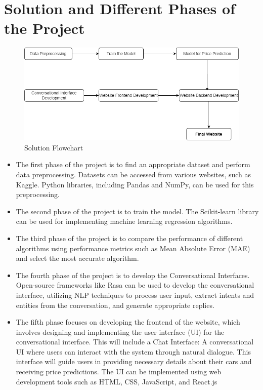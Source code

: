 \documentclass[a4paper,12pt]{article}
\begin{document}
\newpage
\section*{Solution and Different Phases of the Project}
\begin{justify}
\begin{figure}[h]
    \centering
    \includegraphics[width=.8\textwidth]{./Flowchart2.png}
    \caption{Solution Flowchart}
    \label{fig:your-label}
\end{figure}
\vspace{\baselineskip} 
\begin{itemize}
\item The first phase of the project is to find an appropriate dataset and perform data preprocessing. Datasets can be accessed from various websites, such as Kaggle. Python libraries, including Pandas and NumPy, can be used for this preprocessing. 

\item The second phase of the project is to train the model. The Scikit-learn library can be used for implementing machine learning regression algorithms.


\item The third phase of the project is to compare the performance of different algorithms using performance metrics such as Mean Absolute Error (MAE) and select the most accurate algorithm. 


\item The fourth phase of the project is to develop the Conversational Interfaces. Open-source frameworks like Rasa can be used to develop the conversational interface, utilizing NLP techniques to process user input, extract intents and entities from the conversation, and generate appropriate replies. 

\item The fifth phase focuses on developing the frontend of the website, which involves designing and implementing the user interface (UI) for the conversational interface. This will include a Chat Interface: A conversational UI where users can interact with the system through natural dialogue. This interface will guide users in providing necessary details about their cars and receiving price predictions. The UI can be implemented using web development tools such as HTML, CSS, JavaScript, and React.js



\end{itemize}
\end{justify}
\end{document}

